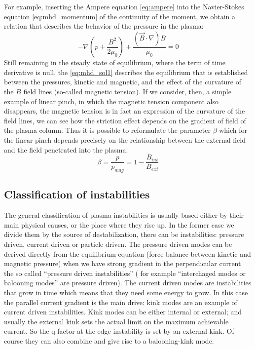 For example, inserting the Ampere equation \eqref{eq:ampere} into the Navier-Stokes equation \eqref{eq:mhd_momentum} of the continuity of the moment, we obtain a relation that describes the behavior of the pressure in the plasma:
\begin{equation}
 \label{eq:mhd_sol1}
 -\nabla \left( p+\frac{B^2}{2\mu_0} \right) + \frac{
  (\Vec{B}\cdot\nabla)B}{\mu_0} = 0
\end{equation}
Still remaining in the steady state of equilibrium, where the term of time derivative is null, the \eqref{eq:mhd_sol1} describes the equilibrium that is established between the pressures, kinetic and magnetic, and the effect of the curvature of the ${B}$ field lines (so-called magnetic tension). If we consider, then, a simple example of linear pinch, in which the magnetic tension component also disappears, the magnetic tension is in fact an expression of the curvature of the field lines, we can see how the striction effect depends on the gradient of field of the plasma column. Thus it is possible to reformulate the parameter $ \beta $ which for the linear pinch depends precisely on the relationship between the external field and the field penetrated into the plasma:
\begin{equation}
\beta = \frac{p}{p_{mag}} = 1-\frac{B_{int}}{B_{ext}}
\end{equation}



\subsection{Classification of instabilities}
\label{sez:classificazione}

The general classification of plasma instabilities is usually based either by their main physical causes, or the place where they rise up.
%
In the former case we divide them by the source of destabilization, there can be instabilities: pressure driven, current driven or particle driven. 
The pressure driven modes can be derived directly from the equilibrium equation (force balance between kinetic and magnetic pressure) when we have strong gradient in the perpendicular current the so called “pressure driven instabilities” ( for example “interchaged modes or balooning modes” are pressure driven).
The current driven modes are instabilities that grow in time which means that they need some energy to grow. In this case the parallel current gradient is the main drive: kink modes are an example of current driven instabilities. Kink modes can be either internal or external; and usually the external kink sets the actual limit on the maximum achievable current. So the q factor at the edge instability is set by an external kink. Of course they can also combine and give rise to a balooning-kink mode.

